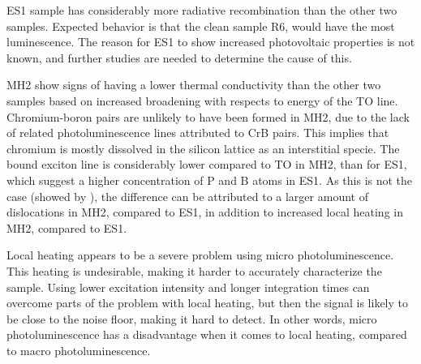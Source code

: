 ES1 sample has considerably more radiative recombination than the other two samples. Expected behavior is that the clean sample R6, would have the most luminescence. The reason for ES1 to show increased photovoltaic properties is not known, and further studies are needed to determine the cause of this.

MH2 show signs of having a lower thermal conductivity than the other two samples based on increased broadening with respects to energy of the TO line. Chromium-boron pairs are unlikely to have been formed in MH2, due to the lack of related photoluminescence lines attributed to CrB pairs. This implies that chromium is mostly dissolved in the silicon lattice as an interstitial specie. The bound exciton line is considerably lower compared to TO in MH2, than for ES1, which suggest a higher concentration of P and B atoms in ES1. As this is not the case (showed by \cite{hystad09}), the difference can be attributed to a larger amount of dislocations in MH2, compared to ES1, in addition to increased local heating in MH2, compared to ES1.

Local heating appears to be a severe problem using micro photoluminescence. This heating is undesirable, making it harder to accurately characterize the sample. Using lower excitation intensity and longer integration times can overcome parts of the problem with local heating, but then the signal is likely to be close to the noise floor, making it hard to detect. In other words, micro photoluminescence has a disadvantage when it comes to local heating, compared to macro photoluminescence.